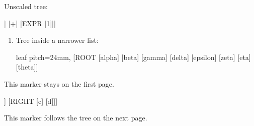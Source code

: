 \documentclass{article}
\begin{document}
Unscaled tree:
\begin{fittedterminaltree}
  [EXPR [EXPR [x]] [+] [EXPR [1]]]
\end{fittedterminaltree}
\begin{enumerate}
\item Tree inside a narrower list:
\begin{fittedterminaltree}
  leaf pitch=24mm,
  [ROOT [alpha] [beta] [gamma] [delta] [epsilon] [zeta] [eta] [theta]]
\end{fittedterminaltree}
\end{enumerate}
\vspace*{170mm}
This marker stays on the first page.
\begin{fittedterminaltree}
  [ROOT [LEFT [a] [b]] [RIGHT [c] [d]]]
\end{fittedterminaltree}
This marker follows the tree on the next page.
\end{document}
